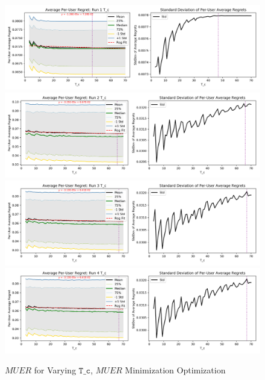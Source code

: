 	\begin{figure}[H]
	\includegraphics[width=1.1\textwidth,center]{figures/opt_param/opt_param_11100_T_c1.png}%
	\newline
	\includegraphics[width=1.1\textwidth,center]{figures/opt_param/opt_param_11100_T_c2.png}%
	\newline
	\includegraphics[width=1.1\textwidth,center]{figures/opt_param/opt_param_11100_T_c3.png}%
	\newline
	\includegraphics[width=1.1\textwidth,center]{figures/opt_param/opt_param_11100_T_c4.png}%
	\caption{$MUER$ for Varying $\mathtt{T\_c}$, $MUER$ Minimization Optimization}
	\end{figure}

